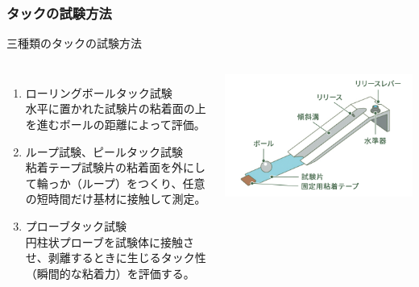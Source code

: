 \documentclass[unicode,12pt]{beamer}%
\begin{document}
\begin{frame}
	\frametitle{タックの試験方法}
	\begin{block}{三種類のタックの試験方法}
		\begin{columns}[c, onlytextwidth]
			
				\begin{enumerate}
					\item ローリングボールタック試験\\
					水平に置かれた試験片の粘着面の上を進むボールの距離によって評価。
					\item ループ試験、ピールタック試験\\
					粘着テープ試験片の粘着面を外にして輪っか（ループ）をつくり、任意の短時間だけ基材に接触して測定。
					\item プローブタック試験\\
					円柱状プローブを試験体に接触させ、剥離するときに生じるタック性（瞬間的な粘着力）を評価する。
				\end{enumerate}
			
			\centering
			\includegraphics[width=\textwidth]{balltack.png}


\end{columns}
\end{block}
\end{frame}
\end{document}
